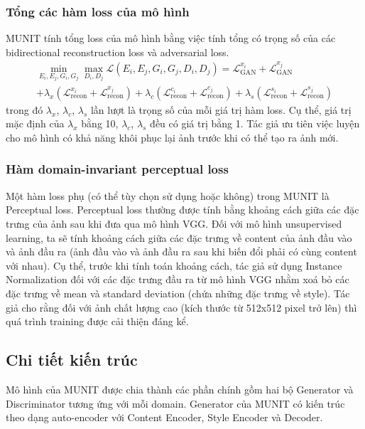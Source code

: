 {    \subsubsection{Tổng các hàm loss của mô hình}
    MUNIT tính tổng loss của mô hình bằng việc tính tổng có trọng số của các bidirectional reconstruction loss và adversarial loss.
    \begin{multline}
    \underset{E_{i}, E_{j}, G_{i}, G_{j}} \min \underset {D_{i}, D_{j}} \max \mathcal{L}(E_{i}, E_{j}, G_{i}, G_{j}, D_{i}, D_{j}) = \mathcal{L}^{x_{i}}_{\text{GAN}} + \mathcal{L}^{x_{j}}_{\text{GAN}} \\+ \lambda_{x}(\mathcal{L}^{x_{i}}_{\text{recon}} +  \mathcal{L}^{x_{j}}_{\text{recon}})
    + \lambda_{c}(\mathcal{L}^{c_{i}}_{\text{recon}} +  \mathcal{L}^{c_{j}}_{\text{recon}}) +  \lambda_{s}(\mathcal{L}^{s_{i}}_{\text{recon}} +  \mathcal{L}^{s_{j}}_{\text{recon}})
    \end{multline}
    trong đó $\lambda_{x}$, $\lambda_{c}$, $\lambda_{s}$ lần lượt là trọng số của mỗi giá trị hàm loss. Cụ thể, giá trị mặc định của $\lambda_{x}$ bằng 10, $\lambda_{c}$, $\lambda_{s}$ đều có giá trị bằng 1. Tác giả ưu tiên việc luyện cho mô hình có khả năng khôi phục lại ảnh trước khi có thể tạo ra ảnh mới.
    
    \subsubsection{Hàm domain-invariant perceptual loss}
    Một hàm loss phụ (có thể tùy chọn sử dụng hoặc không) trong MUNIT là Perceptual loss. Perceptual loss thường được tính bằng khoảng cách giữa các đặc trưng của ảnh sau khi đưa qua mô hình VGG. Đối với mô hình unsupervised learning, ta sẽ tính khoảng cách giữa các đặc trưng về content của ảnh đầu vào và ảnh đầu ra (ảnh đầu vào và ảnh đầu ra sau khi biến đổi phải có cùng content với nhau). Cụ thể, trước khi tính toán khoảng cách, tác giả sử dụng Instance Normalization đối với các đặc trưng đầu ra từ mô hình VGG nhằm xoá bỏ các đặc trưng về mean và standard deviation (chứa những đặc trưng về style). Tác giả cho rằng đối với ảnh chất lượng cao (kích thước từ 512x512 pixel trở lên) thì quá trình training được cải thiện đáng kể.
    
    
    \subsection{Chi tiết kiến trúc}
    Mô hình của MUNIT được chia thành các phần chính gồm hai bộ Generator và Discriminator tương ứng với mỗi domain. Generator của MUNIT có kiến trúc theo dạng auto-encoder với Content Encoder, Style Encoder và Decoder.
    
}

